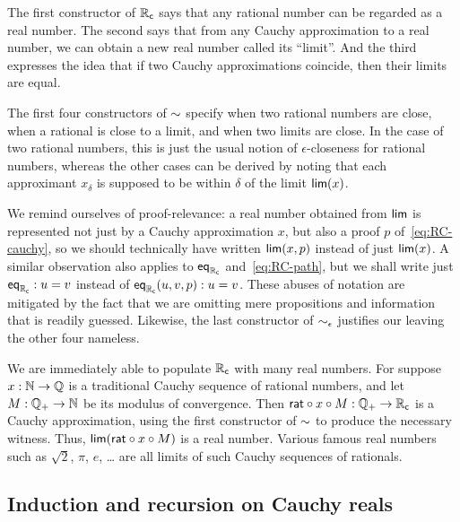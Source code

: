 \mentalpause

The first constructor of $\mathbb{R}_\mathsf{c}$ says that any rational number can be regarded as a real number.
The second says that from any Cauchy approximation to a real number, we can obtain a new real number called its ``limit''.
And the third expresses the idea that if two Cauchy approximations coincide, then their limits are equal.

The first four constructors of $\mathord\sim$ specify when two rational numbers are close, when a rational is close to a limit, and when two limits are close.
In the case of two rational numbers, this is just the usual notion of $\epsilon$-closeness for rational numbers, whereas the other cases can be derived by noting that each approximant $x_\delta$ is supposed to be within $\delta$ of the limit $\mathsf{lim}(x)$.

We remind ourselves of proof-relevance: a real number obtained from $\mathsf{lim}$ is represented not
just by a Cauchy approximation $x$, but also a proof $p$ of~\eqref{eq:RC-cauchy}, so we
should technically have written $\mathsf{lim}(x,p)$ instead of just $\mathsf{lim}(x)$.
A similar observation also applies to $\mathsf{eq}_{\mathbb{R}_\mathsf{c}}$ and~\eqref{eq:RC-path}, but we shall write just
$\mathsf{eq}_{\mathbb{R}_\mathsf{c}} : u = v$ instead of $\mathsf{eq}_{\mathbb{R}_\mathsf{c}}(u, v, p) : u = v$. These abuses of notation are
mitigated by the fact that we are omitting mere propositions and information that is
readily guessed.
Likewise, the last constructor of $\mathord{\sim_{\epsilon}}$ justifies our leaving the other four nameless.

We are immediately able to populate $\mathbb{R}_\mathsf{c}$ with many real numbers. For suppose $x : \mathbb{N} \to
\mathbb{Q}$ is a traditional Cauchy sequence of rational numbers, and let $M : \mathbb{Q}_{+} \to \mathbb{N}$ be its
modulus of convergence. Then $\mathsf{rat} \circ x \circ M : \mathbb{Q}_{+} \to \mathbb{R}_\mathsf{c}$ is a Cauchy
approximation, using the first constructor of $\mathord\sim$ to produce the necessary witness.
Thus, $\mathsf{lim}(\mathsf{rat} \circ x \circ M)$ is a real number. Various famous
real numbers such as $\sqrt{2}$, $\pi$, $e$, \dots{} are all limits of such Cauchy sequences of
rationals.

\subsection{Induction and recursion on Cauchy reals}
\label{sec:induct-recurs-cauchy}

